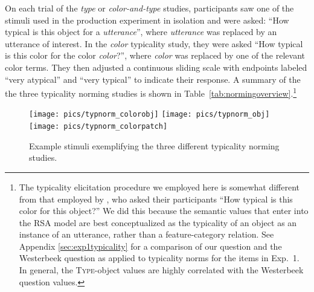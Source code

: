 \documentclass[11pt]{article}
\newcommand{\appref}[1]{Appendix \ref{#1}}
\begin{document}
On each trial of the \emph{type} or \emph{color-and-type} studies, participants saw one of the stimuli used in the production experiment in isolation and were asked: ``How typical is this object for a \emph{utterance}'', where \emph{utterance} was replaced by an utterance of interest. In the \emph{color} typicality study, they were asked ``How typical is this color for the color \emph{color}?'', where \emph{color} was replaced by one of the relevant color terms. They then adjusted a continuous sliding scale with endpoints labeled ``very atypical'' and ``very typical'' to indicate their response. A summary of the the three typicality norming studies is shown in Table~\ref{tab:normingoverview}.\footnote{The typicality elicitation procedure we employed here is somewhat different from that employed by , who asked their participants ``How typical is this color for this object?'' We did this because the semantic values that enter into the RSA model are best conceptualized as the typicality of an object as an instance of an utterance, rather than a feature-category relation.
See \appref{sec:exp1typicality} for a comparison of our question and the Westerbeek question as applied to typicality norms for the items in Exp.~1. In general, the \textsc{Type}-object values are highly correlated with the Westerbeek question values.} 

\begin{figure}[bt!]
	 {\texttt{[image: pics/typnorm\_colorobj]}} \hfill
	{\texttt{[image: pics/typnorm\_obj]}} \hfill
	 {\texttt{[image: pics/typnorm\_colorpatch]}}%
	\caption{Example stimuli exemplifying the three different typicality norming studies.}
	\label{fig:typ_norm}
\end{figure}
\end{document}
